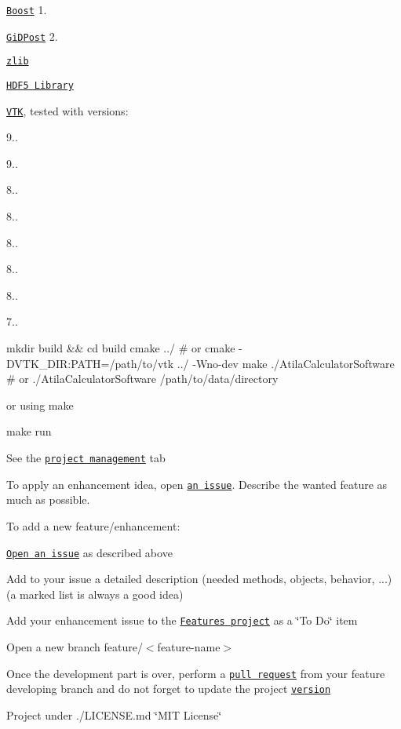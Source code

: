 
\begin{DoxyItemize}
\item \href{https://www.boost.org/}{\tt Boost} 1.
\item \href{https://www.gidhome.com/gid-plus/tools/476/gidpost/}{\tt Gi\+D\+Post} 2.
\item \href{https://zlib.net/}{\tt zlib}
\item \href{https://portal.hdfgroup.org/pages/viewpage.action?pageId=50073884}{\tt H\+D\+F5 Library}
\item \href{https://vtk.org/}{\tt V\+TK}, tested with versions\+:
\begin{DoxyItemize}
\item 9..
\item 9..
\item 8..
\item 8..
\item 8..
\item 8..
\item 8..
\item 7..
\end{DoxyItemize}
\end{DoxyItemize}


\begin{DoxyCode}
mkdir build && cd build
cmake ../ # or cmake -DVTK\_DIR:PATH=/path/to/vtk ../ -Wno-dev
make
./AtilaCalculatorSoftware # or ./AtilaCalculatorSoftware /path/to/data/directory
\end{DoxyCode}


or using make


\begin{DoxyCode}
make run
\end{DoxyCode}


See the \href{https://github.com/Xisabla/AtilaCalculatorSoftware/projects}{\tt project management} tab

To apply an enhancement idea, open \href{https://github.com/Xisabla/AtilaCalculatorSoftware/issues}{\tt an issue}. Describe the wanted feature as much as possible.

To add a new feature/enhancement\+:
\begin{DoxyItemize}
\item \href{https://github.com/Xisabla/AtilaCalculatorSoftware/issues}{\tt Open an issue} as described above
\item Add to your issue a detailed description (needed methods, objects, behavior, ...) (a marked list is always a good idea)
\item Add your enhancement issue to the \href{https://github.com/Xisabla/AtilaCalculatorSoftware/projects/2}{\tt {\ttfamily Features} project} as a \char`\"{}\+To Do\char`\"{} item
\item Open a new branch {\ttfamily feature/$<$feature-\/name$>$}
\item Once the development part is over, perform a \href{https://github.com/Xisabla/AtilaCalculatorSoftware/pulls}{\tt pull request} from your feature developing branch and do not forget to update the project \href{https://github.com/Xisabla/AtilaCalculatorSoftware/blob/master/include/version.h}{\tt version}
\end{DoxyItemize}

Project under ./\+L\+I\+C\+E\+N\+SE.md \char`\"{}\+M\+I\+T License\char`\"{} 